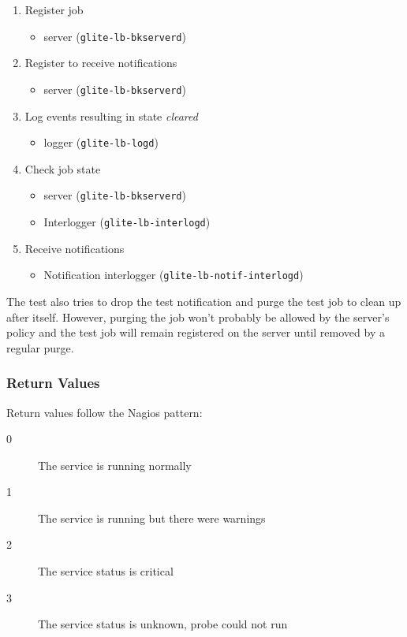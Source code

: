 \begin{enumerate}
\item Register job
	\begin{itemize}
	\item \LB server (\texttt{glite-lb-bkserverd})
	\end{itemize}
\item Register to receive notifications 
	\begin{itemize}
	\item \LB server (\texttt{glite-lb-bkserverd}) 
	\end{itemize}
\item Log events resulting in state \emph{cleared}
	\begin{itemize}
	\item \LB logger (\texttt{glite-lb-logd})
	\end{itemize}
\item Check job state
	\begin{itemize}
	\item \LB server (\texttt{glite-lb-bkserverd}) 
	\item Interlogger (\texttt{glite-lb-interlogd})
	\end{itemize}
\item Receive notifications
	\begin{itemize}
	\item Notification interlogger (\texttt{glite-lb-notif-interlogd})
	\end{itemize}
\end{enumerate}

The test also tries to drop the test notification and purge the test job to clean up after itself. However, purging the job won't probably be allowed by the \LB server's policy and the test job will remain registered on the \LB server until removed by a regular purge.

\subsubsection{Return Values}
Return values follow the Nagios pattern:

\begin{description}
\item[0] The service is running normally
\item[1] The service is running but there were warnings
\item[2] The service status is critical
\item[3] The service status is unknown, probe could not run
\end{description}

